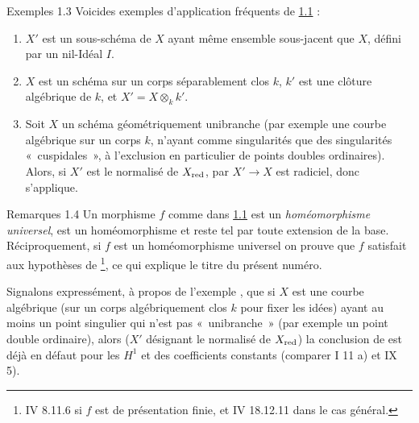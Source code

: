 \documentclass[10pt]{../fichiers-configuration-latex/smfart}
\begin{document}
\begin{enonce*}[remark]{Exemples 1.3}
Voici\pageoriginale  des exemples d'application fréquents de \hyperref[VIII.thm1.1]{1.1} :
\begin{enumerate}
\renewcommand{\theenumi}{\alph{enumi}}
\renewcommand{\labelenumi}{\theenumi)}
\item $X'$ est un sous-schéma de $X$ ayant même ensemble sous-jacent
  que $X$, \ie défini par un nil-Idéal $I$.

\item $X$ est un schéma sur un corps séparablement clos $k$, $k'$ est
  une clôture algébrique de $k$, et $X'= X \otimes_k k'$.

\item Soit $X$ un schéma géométriquement unibranche (par exemple une
  courbe algébrique sur un corps $k$, n'ayant comme singularités que
  des singularités « cuspidales », à l'exclusion en particulier de
  points doubles ordinaires). Alors, si $X'$ est le normalisé de
  $X_{\operatorname{red}}$, par  $X'\to X$ est radiciel, donc
   s'applique.
\end{enumerate}
\end{enonce*}

\begin{enonce*}[remark]{Remarques 1.4}
Un morphisme $f$ comme dans \hyperref[VIII.thm1.1]{1.1} est un \emph{homéomorphisme
  universel}, \ie est un homéomorphisme et reste tel par toute
  extension de la base. Réciproquement, si $f$ est un homéomorphisme
  universel on prouve que $f$ satisfait aux hypothèses de 
  \footnote{\Cf \EGA IV 8.11.6 si $f$ est de présentation finie, et \EGA
  IV 18.12.11 dans le cas général.}, ce qui explique le titre du
  présent numéro.

Signalons expressément, à propos de l'exemple ,
que si $X$ est
une courbe algébrique (sur un corps algébriquement clos $k$ pour fixer
les idées) ayant au moins un point singulier qui n'est pas « unibranche » (par exemple un point double ordinaire), alors ($X'$
désignant le normalisé de $X_{\operatorname{red}}$) la conclusion de 
est déjà en
défaut pour les $H^1$ et des coefficients constants (comparer  I
11 a) et  IX 5).
\end{enonce*}
\end{document}
